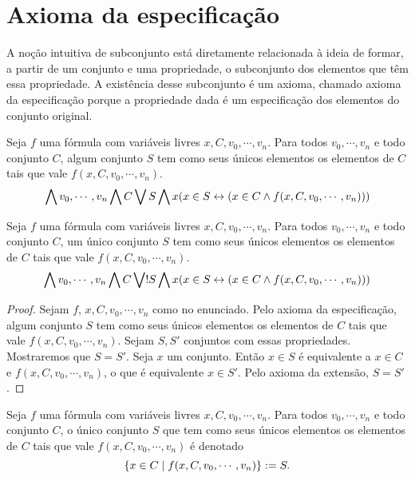 \section{Axioma da especificação}

A noção intuitiva de subconjunto está diretamente relacionada à ideia de formar, a partir de um conjunto e uma propriedade, o subconjunto dos elementos que têm essa propriedade. A existência desse subconjunto é um axioma, chamado axioma da especificação porque a propriedade dada é um especificação dos elementos do conjunto original.

\begin{axiom}
Seja $f$ uma fórmula com variáveis livres $x,C,v_0,\cdots,v_n$. Para todos $v_0,\cdots,v_n$ e todo conjunto $C$, algum conjunto $S$ tem como seus únicos elementos os elementos de $C$ tais que vale $f(x,C,v_0,\cdots,v_n)$.
	\begin{equation*}
	\bigwedge\nolimits v_0,\cdots,v_n \bigwedge\nolimits C \bigvee\nolimits S \bigwedge\nolimits x(x \in S \leftrightarrow (x \in C \land f(x,C,v_0,\cdots,v_n)))
	\end{equation*}
\end{axiom}

\begin{proposition}
Seja $f$ uma fórmula com variáveis livres $x,C,v_0,\cdots,v_n$. Para todos $v_0,\cdots,v_n$ e todo conjunto $C$, um único conjunto $S$ tem como seus únicos elementos os elementos de $C$ tais que vale $f(x,C,v_0,\cdots,v_n)$.
	\begin{equation*}
	\bigwedge\nolimits v_0,\cdots,v_n \bigwedge\nolimits C \bigvee\nolimits! S \bigwedge\nolimits x(x \in S \leftrightarrow (x \in C \land f(x,C,v_0,\cdots,v_n)))
	\end{equation*}
\end{proposition}
\begin{proof}
Sejam $f$, $x,C,v_0,\cdots,v_n$ como no enunciado. Pelo axioma da especificação, algum conjunto $S$ tem como seus únicos elementos os elementos de $C$ tais que vale $f(x,C,v_0,\cdots,v_n)$. Sejam $S,S'$ conjuntos com essas propriedades. Mostraremos que $S=S'$. Seja $x$ um conjunto. Então $x \in S$ é equivalente a $x \in C$ e $f(x,C,v_0,\cdots,v_n)$, o que é equivalente $x \in S'$. Pelo axioma da extensão, $S=S'$.
\end{proof}

\begin{definition}
Seja $f$ uma fórmula com variáveis livres $x,C,v_0,\cdots,v_n$. Para todos $v_0,\cdots,v_n$ e todo conjunto $C$, o único conjunto $S$ que tem como seus únicos elementos os elementos de $C$ tais que vale $f(x,C,v_0,\cdots,v_n)$ é denotado
	\begin{equation*}
	\left\{{x \in C}\;\middle\vert\;{f(x,C,v_0,\cdots,v_n)}\right\} := S.
	\end{equation*}
\end{definition}

